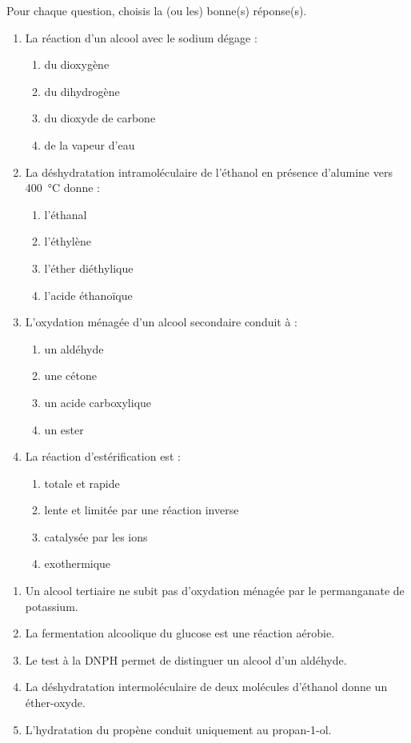 \documentclass[11pt]{article}
\begin{document}
\begin{exercice}
Pour chaque question, choisis la (ou les) bonne(s) réponse(s).
\begin{enumerate}
  \item La réaction d'un alcool avec le sodium dégage :
  \begin{enumerate}
    \item du dioxygène
    \item du dihydrogène
    \item du dioxyde de carbone
    \item de la vapeur d'eau
  \end{enumerate}
  \item La déshydratation intramoléculaire de l'éthanol en présence d'alumine  vers \SI{400}{\celsius} donne :
  \begin{enumerate}
    \item l'éthanal
    \item l'éthylène
    \item l'éther diéthylique
    \item l'acide éthanoïque
  \end{enumerate}
  \item L'oxydation ménagée d'un alcool secondaire conduit à :
  \begin{enumerate}
    \item un aldéhyde
    \item une cétone
    \item un acide carboxylique
    \item un ester
  \end{enumerate}
  \item La réaction d'estérification est :
  \begin{enumerate}
    \item totale et rapide
    \item lente et limitée par une réaction inverse
    \item catalysée par les ions 
    \item exothermique
  \end{enumerate}
\end{enumerate}
\end{exercice}

\begin{exercice}
\begin{enumerate}
  \item Un alcool tertiaire ne subit pas d'oxydation ménagée par le permanganate de potassium.
  \item La fermentation alcoolique du glucose est une réaction aérobie.
  \item Le test à la DNPH permet de distinguer un alcool d'un aldéhyde.
  \item La déshydratation intermoléculaire de deux molécules d'éthanol donne un éther-oxyde.
  \item L'hydratation du propène conduit uniquement au propan-1-ol.
\end{enumerate}
\end{exercice}
\end{document}
